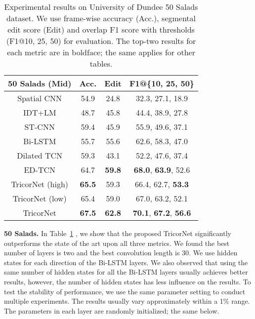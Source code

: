 \documentclass{article}
\begin{document}
\begin{table}
	\centering
	\caption{Experimental results on University of Dundee 50 Salads dataset. We use frame-wise accuracy (Acc.), segmental edit score (Edit) and overlap F1 score with thresholds (F1@10, 25, 50) for evaluation. The top-two results for each metric are in boldface; the same applies for other tables.}
	\label{salads}
	\begin{tabular}{|c|c|c|c|}
		\hline
		\textbf{50 Salads (Mid)} & \textbf{Acc.} & \textbf{Edit} & \textbf{F1@\{10, 25, 50\}} \\ \hline
		Spatial CNN \cite{scnn}              & 54.9              & 24.8                & 32.3, 27.1, 18.9                \\
		IDT+LM   \cite{richard}                & 48.7              & 45.8                & 44.4, 38.9, 27.8                \\
		ST-CNN   \cite{scnn}                & 59.4              & 45.9                & 55.9, 49.6, 37.1                \\
		Bi-LSTM                  & 55.7              & 55.6                & 62.6, 58.3, 47.0                \\
		Dilated TCN    \cite{LeFlViCVPR2017}          & 59.3              & 43.1                & 52.2, 47.6, 37.4                \\
		ED-TCN       \cite{LeFlViCVPR2017}            & 64.7             & \textbf{59.8}                & \textbf{68.0}, \textbf{63.9}, 52.6                \\ \hline
		TricorNet (high)                     & \textbf{65.5}     & 59.3       & 66.4, 62.7, \textbf{53.3}       \\
		TricorNet (low)                     & 65.4     & 59.0      & 67.0, 63.2, 52.1      \\
		TricorNet                     & \textbf{67.5}     & \textbf{62.8}       & \textbf{70.1}, \textbf{67.2}, \textbf{56.6}       \\ \hline
	\end{tabular}
\end{table}

\noindent \textbf{50 Salads.} \quad In Table~\ref{salads} , we show that the proposed TricorNet significantly outperforms the state of the art upon all three metrics. We found the best number of layers is two and the best convolution length is 30. We use  hidden states for each direction of the Bi-LSTM layers. We also observed that using the same number of hidden states for all the Bi-LSTM layers usually achieves better results, however, the number of hidden states has less influence on the results. To test the stability of performance, we use the same parameter setting to conduct multiple experiments. The results usually vary approximately within a 1\% range. The parameters in each layer are randomly initialized; the same below.
\end{document}
